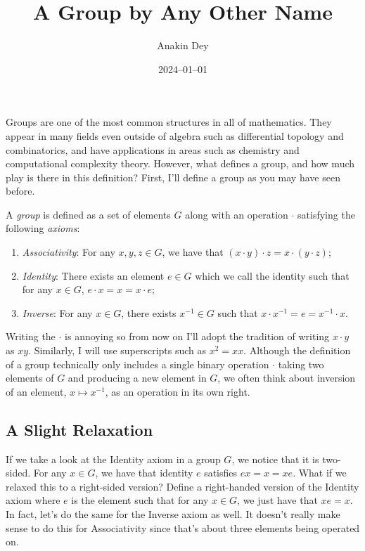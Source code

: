 \documentclass{article}
\title{A Group by Any Other Name}
\author{Anakin Dey}
\date{2024--01--01}
\begin{document}
\maketitle

Groups are one of the most common structures in all of mathematics.
They appear in many fields even outside of algebra such as differential topology and combinatorics, and have applications in areas such as chemistry and computational complexity theory.
However, what defines a group, and how much play is there in this definition?
First, I'll define a group as you may have seen before.

\begin{defn}\label{defn:grp}
  A \emph{group} is defined as a set of elements $G$ along with an operation $\cdot$ satisfying the following \emph{axioms}:
  \begin{enumerate}
  \item \emph{Associativity}: For any $x, y, z \in G$, we have that $(x \cdot y) \cdot z = x \cdot (y \cdot z)$;
  \item \emph{Identity}: There exists an element $e \in G$ which we call the identity such that for any $x \in G$, $e \cdot x = x = x \cdot e$;
  \item \emph{Inverse}: For any $x \in G$, there exists $x^{-1} \in G$ such that $x \cdot x^{-1} = e = x^{-1} \cdot x$.
  \end{enumerate}
\end{defn}

Writing the $\cdot$ is annoying so from now on I'll adopt the tradition of writing $x \cdot y$ as $xy$.
Similarly, I will use superscripts such as $x^{2} = xx$.
Although the definition of a group technically only includes a single binary operation $\cdot$ taking two elements of $G$ and producing a new element in $G$, we often think about inversion of an element, $x \mapsto x^{-1}$, as an operation in its own right.

\subsection*{A Slight Relaxation}

If we take a look at the Identity axiom in a group $G$, we notice that it is two-sided.
For any $x \in G$, we have that identity $e$ satisfies $ex = x = xe$.
What if we relaxed this to a right-sided version?
Define a right-handed version of the Identity axiom where $e$ is the element such that for any $x \in G$, we just have that $xe = x$.
In fact, let's do the same for the Inverse axiom as well.
It doesn't really make sense to do this for Associativity since that's about three elements being operated on.
\end{document}
